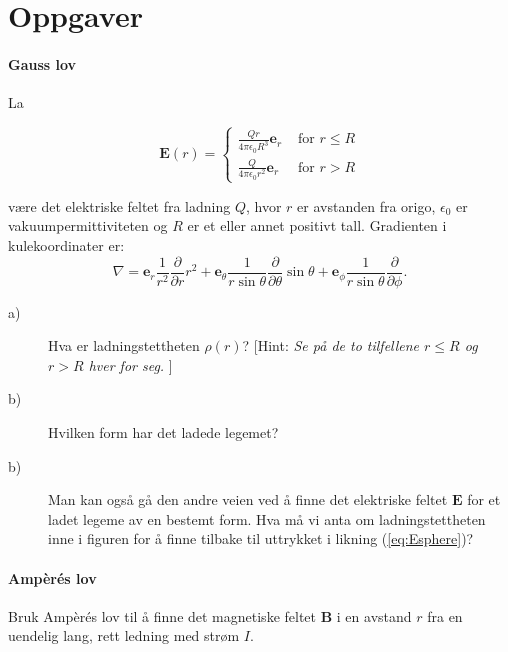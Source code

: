 \documentclass[twoside,utf8]{article}
\begin{document}
\part*{Oppgaver}
\subsection{Gauss lov}
La

\begin{equation}
\mathbf{E}(r) =
\begin{cases}
\frac{Qr}{4\pi \epsilon_0 R^3} \mathbf{e}_r &\text{ for } r \leq R \\
\frac{Q}{4\pi \epsilon_0 r^2} \mathbf{e}_r  &\text{ for } r > R
\end{cases}
\label{eq:Esphere}\end{equation}

være det elektriske feltet fra ladning $Q$, hvor $r$ er avstanden fra origo, $\epsilon_0$ er vakuumpermittiviteten og $R$ er et eller annet positivt tall. Gradienten i kulekoordinater er:
\begin{equation}
\nabla =
 \mathbf{e}_r \frac{1}{r^2}\frac{\partial}{\partial r}r^2
+\mathbf{e}_\theta \frac{1}{r\sin \theta}\frac{\partial}{\partial\theta}\sin \theta
+\mathbf{e}_\phi \frac{1}{r\sin \theta}\frac{\partial}{\partial\phi}.
\label{eq:sphereNabla}\end{equation}

\begin{description}
	\item[a)] Hva er ladningstettheten $\rho(r)$?
		[Hint: {\it Se på de to tilfellene $r\leq R$ og $r>R$ hver for seg. }]
	\item[b)] Hvilken form har det ladede legemet?
	\item[b)]
	Man kan også gå den andre veien ved å finne det elektriske feltet $\mathbf{E}$ for et ladet legeme av en bestemt form. Hva må vi anta om ladningstettheten inne i figuren for å finne tilbake til uttrykket i likning (\ref{eq:Esphere})?
\end{description}



\subsection{Ampèrés lov}
Bruk Ampèrés lov til å finne det magnetiske feltet $\mathbf{B}$ i en avstand $r$ fra en uendelig lang, rett ledning med strøm $I$.
\end{document}
